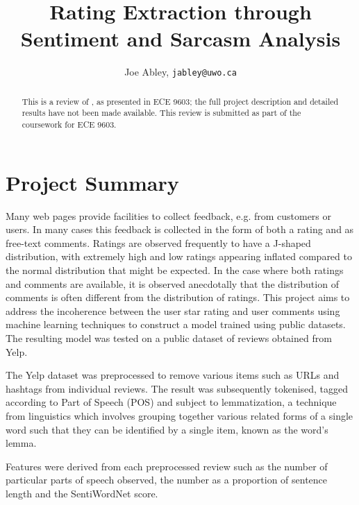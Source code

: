 \documentclass[fontsize=9pt,letterpaper,twocolumn]{scrartcl}
\begin{document}
\titlehead{{\Large Western University \hfill ECE 9603\\}
  Electrical and Computer Engineering \hfill Fall 2018}
\subject{Project Review}
\title{Rating Extraction through Sentiment and Sarcasm Analysis}
\author{Joe Abley, \texttt{jabley@uwo.ca}}

\maketitle

\begin{abstract}
This is a review of \cite{Manias2018}, as presented in ECE 9603; the full project description and detailed results have not been made available. This review is submitted as part of the coursework for ECE 9603.

\end{abstract}

\section{Project Summary}
Many web pages provide facilities to collect feedback, e.g. from customers or users. In many cases this feedback is collected in the form of both a rating and as free-text comments. Ratings are observed frequently to have a J-shaped distribution, with extremely high and low ratings appearing inflated compared to the normal distribution that might be expected. In the case where both ratings and comments are available, it is observed anecdotally that the distribution of comments is often different from the distribution of ratings. This project aims to address the incoherence between the user star rating and user comments using machine learning techniques to construct a model trained using public datasets. The resulting model was tested on a public dataset of reviews obtained from Yelp\cite{Yelp}.

The Yelp dataset was preprocessed to remove various items such as URLs and hashtags from individual reviews. The result was subsequently tokenised, tagged according to Part of Speech (POS) and subject to lemmatization, a technique from linguistics which involves grouping together various related forms of a single word such that they can be identified by a single item, known as the word's lemma.

Features were derived from each preprocessed review such as the number of particular parts of speech observed, the number as a proportion of sentence length and the SentiWordNet\cite{Baccianella10sentiwordnet3.0} score.
\end{document}
